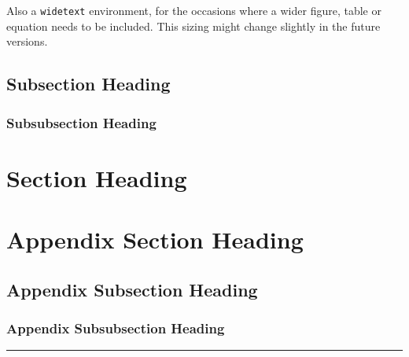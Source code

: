 \documentclass[10pt,arar]{penrose}
\begin{document}
Also a \texttt{widetext} environment, for the occasions where a wider figure, table or equation needs to be included. This sizing might change slightly in the future versions.
\begin{widetext}
  \lipsum[33]
\end{widetext}

\subsection{Subsection Heading}
\lipsum[21]

  \subsubsection{Subsubsection Heading}
  \lipsum[22]

\section{Section Heading}
\lipsum[13]


\appendix
\section{Appendix Section Heading}
\lipsum[11]

\subsection{Appendix Subsection Heading}
\lipsum[12]

  \subsubsection{Appendix Subsubsection Heading}
  \lipsum[13]

\begin{center}
  \vspace*{0.5em}
  \rule{0.8\textwidth}{0.8pt}
\end{center}

\nocite{*}
{\small }
\end{document}
